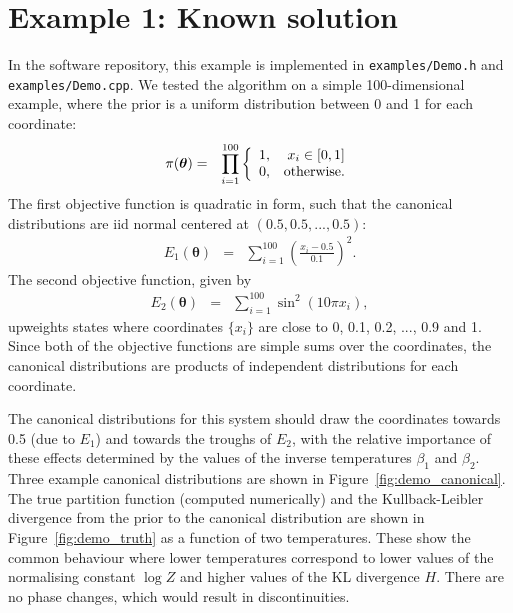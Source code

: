 \documentclass[entropy,article,submit,moreauthors,pdftex,10pt,a4paper]{Definitions/mdpi}
\newcommand{\xx}{\boldsymbol{\theta}}
\begin{document}
\section{Example 1: Known solution}
In the software repository, this example is implemented in
{\tt examples/Demo.h} and {\tt examples/Demo.cpp}.
We tested the algorithm on a simple 100-dimensional example, where the
prior is a uniform distribution between 0 and 1 for each coordinate:
\begin{eqnarray}
\pi(\xx) &=& \prod_{i=1}^{100}
\left\{
\begin{array}{lr}
1, & x_i \in [0, 1]\\
0, & \textnormal{otherwise.}
\end{array}
\right.
\end{eqnarray}
The first objective function is quadratic in form, such that the canonical
distributions are iid normal centered at $(0.5, 0.5, ..., 0.5)$:
\begin{eqnarray}
E_1(\xx) &=& \sum_{i=1}^{100} \left(\frac{x_i - 0.5}{0.1}\right)^2.
\end{eqnarray}
The second objective function, given by
\begin{eqnarray}
E_2(\xx) &=& \sum_{i=1}^{100}\sin^2(10 \pi x_i),
\end{eqnarray}
upweights states where coordinates $\{x_i\}$
are close to 0, 0.1, 0.2, ..., 0.9 and 1.
Since both of the objective functions are simple sums over the coordinates,
the canonical distributions are products of independent distributions for
each coordinate.

The canonical distributions for this system should draw the coordinates
towards 0.5 (due to $E_1$) and towards the troughs of $E_2$, with the
relative importance of these effects determined by the values of the
inverse temperatures $\beta_1$ and $\beta_2$. Three example canonical
distributions are shown in Figure~\ref{fig:demo_canonical}.
The true partition function (computed numerically) and the Kullback-Leibler
divergence from the prior to the canonical distribution are shown in
Figure~\ref{fig:demo_truth} as a function of two temperatures. These show the
common behaviour where lower temperatures correspond to lower values
of the normalising constant $\log Z$ and higher values of the KL divergence
$H$. There are no phase changes, which would result in discontinuities.
\end{document}
